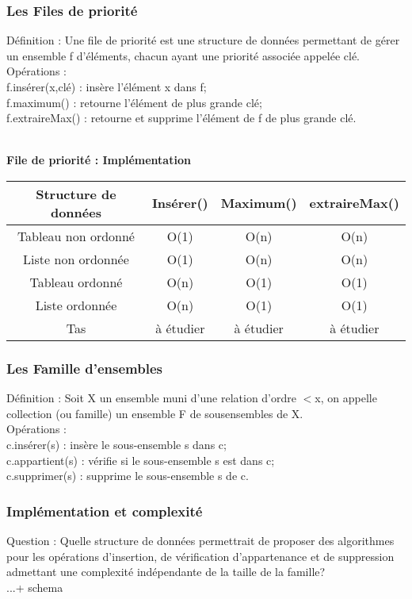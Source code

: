 \documentclass[5pt]{article}
\begin{document}
\begin{scriptsize}
\subsubsection{Les Files de priorité }
Définition : Une file de priorité est une structure de données permettant de gérer un ensemble f d’éléments, chacun ayant une priorité associée appelée clé.\\
Opérations :\\
f.insérer(x,clé) : insère l’élément x dans f;\\
f.maximum() : retourne l’élément de plus grande clé;\\
f.extraireMax() : retourne et supprime l’élément de  f de plus grande clé.\\
\\
\begin{center}
\textbf{File de priorité : Implémentation }\\
\noindent
\begin{tabular}{|c|c|c|c|}
\hline
Structure de données & Insérer() & Maximum() & extraireMax()\\ \hline
Tableau non ordonné & O(1) & O(n) & O(n)\\ \hline
Liste non ordonnée &  O(1) & O(n) & O(n)\\ \hline
Tableau ordonné & O(n) & O(1) & O(1)\\ \hline
Liste ordonnée & O(n) & O(1) & O(1)\\ \hline
Tas & à étudier & à étudier & à étudier
\\\hline
\end{tabular} 
\end{center} 
\subsubsection{Les Famille d’ensembles  }

Définition : Soit X un ensemble muni d’une relation d’ordre $<$x, on appelle collection (ou famille) un ensemble F de sousensembles de X.\\
Opérations :\\
c.insérer(s) : insère le sous-ensemble s dans c;\\
c.appartient(s) : vérifie si le sous-ensemble s est dans c;\\
c.supprimer(s) : supprime le sous-ensemble s de c.\\
\subsubsection{Implémentation et complexité }
Question : Quelle structure de données permettrait de proposer des algorithmes pour les opérations d’insertion, de vérification d’appartenance et de suppression admettant une complexité indépendante de la taille de la famille?\\
...+ schema

\end{scriptsize}
\end{document}
